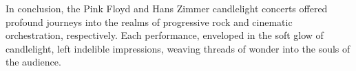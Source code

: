 In conclusion, the Pink Floyd and Hans Zimmer candlelight concerts offered profound journeys into the realms of progressive rock and cinematic orchestration, respectively. Each performance, enveloped in the soft glow of candlelight, left indelible impressions, weaving threads of wonder into the souls of the audience.